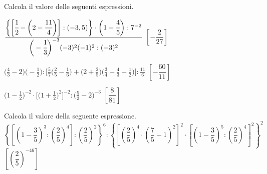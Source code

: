 \begin{esercizio}[\Ast]
\label{ese:3.153}
 Calcola il valore delle seguenti espressioni.
\begin{enumeratea}
\spazielenx
\item \(\displaystyle{\frac{\bigg\{\bigg[\cfrac{1}{2}-\bigg(2-
\cfrac{11}{4}\bigg)\bigg]:(-3,5)\bigg\}\cdot
\bigg(1-\cfrac{4}{5}\bigg):7^{-2}}{\bigg(-{\cfrac{1}{3}}
\bigg)^{-3}(-3)^{2}(-1)^{2}:(-3)^{2}}}\)
  \hfill \(\left[-\dfrac{2}{27} \right]\)
\item \(\displaystyle{\bigg(\frac{4}{3}-2\bigg)\bigg(-{\frac{1}{2}}\bigg):
\bigg[\frac{5}{7}\bigg(\frac{2}{5}-\frac{1}{6}\bigg)
+\bigg(2+\frac{2}{5}\bigg)\bigg(\frac{3}{4}-\frac{4}{3}+
\frac{1}{2}\bigg)\bigg]:\frac{11}{6}}\)
  \hfill \(\left[-\dfrac{60}{11} \right]\)
\item \(\displaystyle{\bigg(1-\frac{1}{2}\bigg)^{-2}\cdot
\bigg[\bigg(1+\frac{1}{2}\bigg)^{2}\bigg]^{-2}:\bigg(\frac{5}{2}-2
\bigg)^{-3}}\)
  \hfill \(\left[\dfrac{8}{81} \right]\)
\end{enumeratea}
\end{esercizio}


\begin{esercizio}[\Ast]
\label{ese:3.154}
Calcola il valore della seguente espressione.
\(
\left\{\left[\left(1-\dfrac{3}{5}\right)^3:\left(\dfrac{2}{5}\right)^{4}\right]:
 \left(\dfrac{2}{5}\right)^{2} \right\}^{6}
:\left\{\left[\left(\dfrac{2}{5}\right)^{4}\cdot\left(\dfrac{7}{5}-
1\right)^2\right]^{2}\cdot%
\left[\left(1-\dfrac{3}{5}\right)^{5}:\left(\dfrac{2}{5}\right)^{4}
\right]^{2}\right\}^{2}
\)
  \hfill \(\left[\left(\dfrac{2}{5} \right)^{-46} \right]\)
\end{esercizio}


